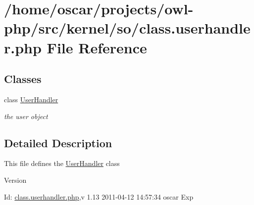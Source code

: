 \section{/home/oscar/projects/owl-\/php/src/kernel/so/class.userhandler.php File Reference}
\label{class_8userhandler_8php}
\subsection*{Classes}
\begin{DoxyCompactItemize}
\item 
class \hyperlink{classUserHandler}{UserHandler}
\begin{DoxyCompactList}\small\item\em the user object \item\end{DoxyCompactList}\end{DoxyCompactItemize}


\subsection{Detailed Description}
This file defines the \hyperlink{classUserHandler}{UserHandler} class \begin{DoxyVersion}{Version}

\end{DoxyVersion}
\begin{DoxyParagraph}{Id:}
\hyperlink{class_8userhandler_8php}{class.userhandler.php},v 1.13 2011-\/04-\/12 14:57:34 oscar Exp 
\end{DoxyParagraph}
